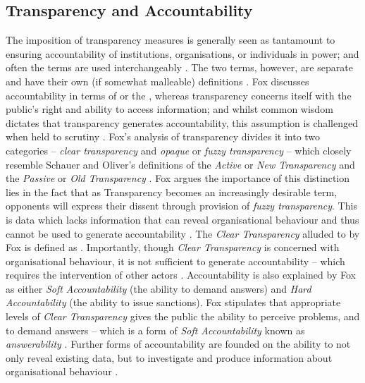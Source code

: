 \subsection{Transparency and Accountability}
The imposition of transparency measures is generally seen as tantamount to ensuring accountability of institutions, organisations, or individuals in power; and often the terms are used interchangeably \cite{fox_uncertain_2007, hood_accountability_2010}. The two terms, however, are separate and have their own (if somewhat malleable) definitions \cite{fox_uncertain_2007}.
%
Fox discusses accountability in terms of  or the , whereas transparency concerns itself with the public's right and ability to access information; and whilst common wisdom dictates that transparency generates accountability, this assumption is challenged when held to scrutiny \cite{fox_uncertain_2007}. Fox's analysis of transparency divides it into two categories -- \textit{clear transparency} and \textit{opaque} or \textit{fuzzy transparency} -- which closely resemble Schauer and Oliver's definitions of the \textit{Active} or \textit{New Transparency} and the \textit{Passive} or \textit{Old Transparency} \cite{schauer_transparency_2011, oliver_what_2004, fox_uncertain_2007}. Fox argues the importance of this distinction lies in the fact that as Transparency becomes an increasingly desirable term, opponents will express their dissent through provision of \textit{fuzzy transparency}. This is data which lacks information that can reveal organisational behaviour and thus cannot be used to generate accountability \cite{fox_uncertain_2007}.
%
The \textit{Clear Transparency} alluded to by Fox is defined as . Importantly, though \textit{Clear Transparency} is concerned with organisational behaviour, it is not sufficient to generate accountability -- which requires the intervention of other actors \cite{fox_uncertain_2007}. Accountability is also explained by Fox as either \textit{Soft Accountability} (the ability to demand answers) and \textit{Hard Accountability} (the ability to issue sanctions). Fox stipulates that appropriate levels of \textit{Clear Transparency} gives the public the ability to perceive problems, and to demand answers -- which is a form of \textit{Soft Accountability} known as \textit{answerability} \cite{fox_uncertain_2007}. Further forms of accountability are founded on the ability to not only reveal existing data, but to investigate and produce information about organisational behaviour \cite{fox_uncertain_2007}.
%

